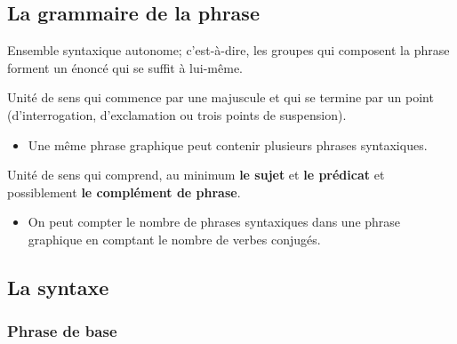 \documentclass[10pt, french]{article}
\begin{document}
\raggedcolumns
\begin{multicols*}{2}

\section{La grammaire de la phrase}
\begin{definitionNOHFILL}
Ensemble syntaxique autonome; c'est-à-dire, les groupes qui composent la phrase forment un énoncé qui se suffit à lui-même.

\begin{definitionNOHFILLsub}
Unité de sens qui commence par une majuscule et qui se termine par un point (d'interrogation, d'exclamation ou trois points de suspension).
\begin{itemize}
	\item	Une même phrase graphique peut contenir plusieurs phrases syntaxiques.
\end{itemize}
\end{definitionNOHFILLsub}%
\begin{definitionNOHFILLsub}
Unité de sens qui comprend, au minimum \textbf{le sujet} et \textbf{le prédicat} et possiblement \textbf{le complément de phrase}.
\begin{itemize}
	\item	On peut compter le nombre de phrases syntaxiques dans une phrase graphique en comptant le nombre de verbes conjugés.
\end{itemize}
\end{definitionNOHFILLsub}
\end{definitionNOHFILL}

\subsection{La syntaxe}
\subsubsection*{Phrase de base}
\begin{center}

\begin{tikzpicture}[x=0.75pt,y=0.75pt,yscale=-1,xscale=1]


\end{tikzpicture}
\end{center}
\end{multicols*}
\end{document}
